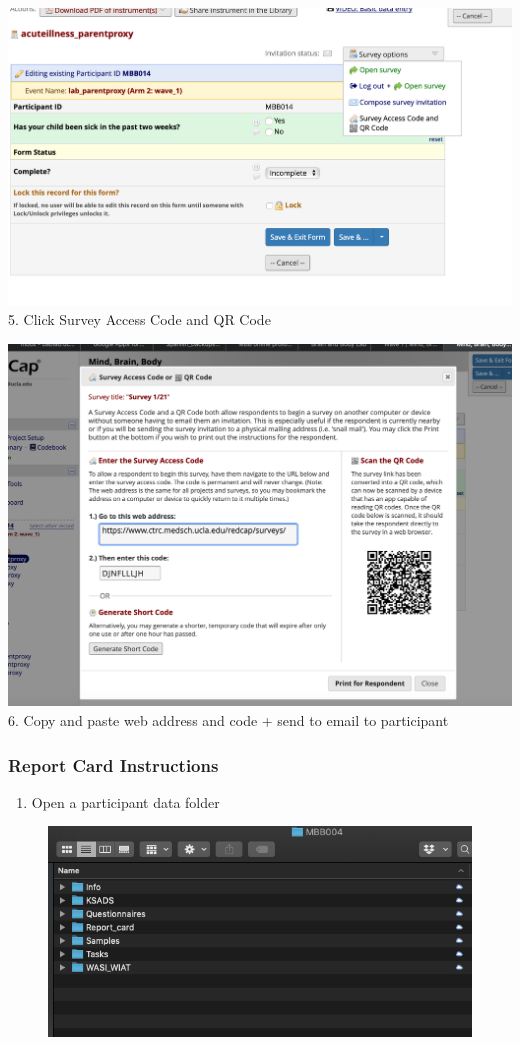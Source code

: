 \documentclass[]{book}
\providecommand{\tightlist}{%
  \setlength{\itemsep}{0pt}\setlength{\parskip}{0pt}}
\begin{document}
\includegraphics{images/redcap_code/4.png}
5. Click Survey Access Code and QR Code

\includegraphics{images/redcap_code/5.png}
6. Copy and paste web address and code + send to email to participant

\hypertarget{report-card-instructions}{%
\subsubsection{Report Card Instructions}\label{report-card-instructions}}

\begin{enumerate}
\def\labelenumi{\arabic{enumi}.}
\tightlist
\item
  Open a participant data folder
\end{enumerate}

\begin{figure}
\centering
\includegraphics{images/report_card_online/1.png}
\caption{}
\end{figure}
\end{document}
